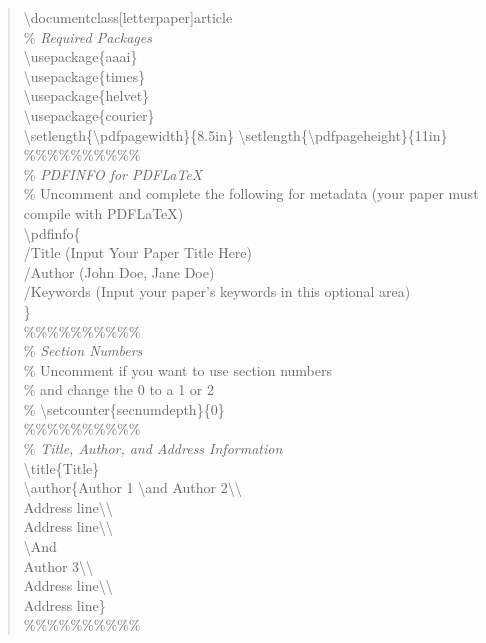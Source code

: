 \documentclass[letterpaper]{article}
\begin{document}
\begin{quote}
\begin{small}
\textbackslash documentclass[letterpaper]{article}\\
\% \textit{Required Packages}\\
\textbackslash usepackage\{aaai\}\\
\textbackslash usepackage\{times\}\\
\textbackslash usepackage\{helvet\}\\
\textbackslash usepackage\{courier\}\\
\textbackslash setlength\{\textbackslash pdfpagewidth\}\{8.5in\}
\textbackslash setlength\{\textbackslash pdfpageheight\}\{11in\}\\
\%\%\%\%\%\%\%\%\%\%\\
\% \textit{PDFINFO for PDF\LaTeX{}}\\
\% Uncomment and complete the following for metadata (your paper must compile with PDF\LaTeX{})\\
\textbackslash pdfinfo\{\\
/Title (Input Your Paper Title Here)\\
/Author (John Doe, Jane Doe)\\
/Keywords (Input your paper's keywords in this optional area)\\
\}\\
\%\%\%\%\%\%\%\%\%\%\\
\% \textit{Section Numbers}\\
\% Uncomment if you want to use section numbers\\
\% and change the 0 to a 1 or 2\\
\% \textbackslash setcounter\{secnumdepth\}\{0\}\\
\%\%\%\%\%\%\%\%\%\%\\
\% \textit{Title, Author, and Address Information}\\
\textbackslash title\{Title\}\\
\textbackslash author\{Author 1 \textbackslash and Author 2\textbackslash\textbackslash \\ 
Address line\textbackslash\textbackslash\\ Address line\textbackslash\textbackslash \\
\textbackslash And\\
Author 3\textbackslash\textbackslash\\ Address line\textbackslash\textbackslash\\ Address line\}\\
\%\%\%\%\%\%\%\%\%\%\\

\end{small}
\end{quote}
\end{document}
